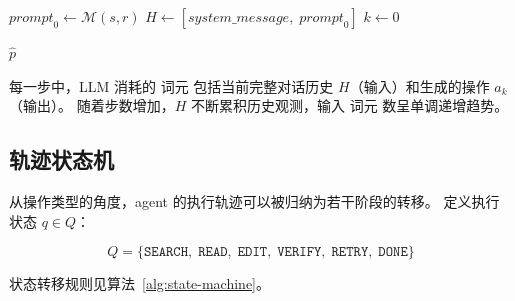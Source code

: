 \begin{algorithm}[H]
\caption{mini-swe-agent ACI 执行循环}
\label{alg:mini-swe-agent-loop}

\BlankLine
$\textit{prompt}_0 \leftarrow \mathcal{M}(s, r)$ 
$H \leftarrow [\textit{system\_message},\; \textit{prompt}_0]$ 
$k \leftarrow 0$\;

\BlankLine
{}

\BlankLine
{}
\Return $\hat{p}$\;
\end{algorithm}

每一步中，LLM 消耗的 词元 包括当前完整对话历史 $H$（输入）和生成的操作 $a_k$（输出）。
随着步数增加，$H$ 不断累积历史观测，输入 词元 数呈单调递增趋势。

\subsection{轨迹状态机}
\label{subsec:trajectory-state-machine}

从操作类型的角度，agent 的执行轨迹可以被归纳为若干阶段的转移。
定义执行状态 $q \in Q$：

\begin{equation}
  Q = \{\texttt{SEARCH},\; \texttt{READ},\; \texttt{EDIT},\; \texttt{VERIFY},\; \texttt{RETRY},\; \texttt{DONE}\}
  \label{eq:state-set}
\end{equation}

状态转移规则见算法~\ref{alg:state-machine}。

